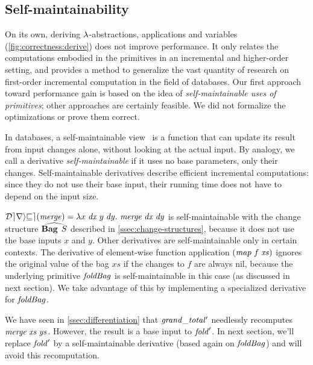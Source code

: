 
\subsection{Self-maintainability}
\label{sec:performance-cons}
\label{ssec:self-maint}

\begin{oldSec}
On its own, deriving $\lambda$-abstractions, applications and
variables (\cref{fig:correctness:derive}) does not improve performance.
It only relates the computations embodied in the primitives in
an incremental and higher-order setting, and provides a method to
generalize the vast quantity of research on first-order incremental
computation in the field of databases.
Our first approach toward performance gain is based on the idea of \emph{self-maintainable uses of primitives};
other approaches are certainly feasible. We did not formalize the
optimizations or prove them correct.
\end{oldSec}

In databases, a self-maintainable view~\citep{Gupta99MMV} is a function that can
update its result from input changes alone, without looking at
the actual input. By analogy, we call a derivative
\emph{self-maintainable} if it uses no
base parameters, only their changes. Self-maintainable derivatives
describe efficient incremental computations: since they do not
use their base input, their running time does not have to depend on the input
size.

\begin{examples}
$\Derive{\MERGE} = \Lam {x\; \D x\; y \; \D y}{\Merge{\D x}{\D y}}$
is self-maintainable with the
change structure $\ChangeStruct{\Bag{S}}$ described in
\cref{ssec:change-structures}, because it does not use the base
inputs $x$ and $y$.
Other derivatives are self-maintainable only in certain contexts.
The derivative of element-wise function application
$\App*{\App\MAP f}{\mathit{xs}}$ ignores the original
value of the bag $\mathit{xs}$ if the changes to
%
$f$ are always nil, because the underlying primitive $\mathit{foldBag}$
is self-maintainable in this case (as discussed in next section).
%
We take advantage of this by implementing a specialized
derivative for $\mathit{foldBag}$.

We have seen in \cref{ssec:differentiation} that $\mathit{grand\_total'}$
needlessly recomputes $\Merge\Xs\Ys$. However, the result is a
base input to $\mathit{fold}'$.
%
In next section, we'll replace $\mathit{fold}'$ by a self-maintainable
derivative (based again on $\mathit{foldBag}$) and will avoid this
recomputation.
\end{examples}

